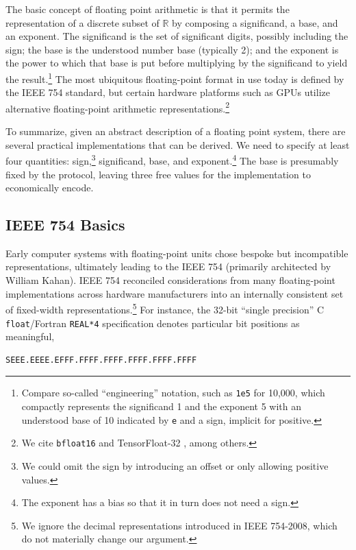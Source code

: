 \documentclass[twoside]{article}
\begin{document}
The basic concept of floating point arithmetic is that it permits the representation of a discrete subset of $\mathbb{R}$ by composing a significand, a base, and an exponent.  The significand is the set of significant digits, possibly including the sign; the base is the understood number base (typically 2); and the exponent is the power to which that base is put before multiplying by the significand to yield the result.\footnote{Compare so-called “engineering” notation, such as \texttt{1e5} for 10,000, which compactly represents the significand 1 and the exponent 5 with an understood base of 10 indicated by \texttt{e} and a sign, implicit for positive.}  The most ubiquitous floating-point format in use today is defined by the IEEE 754 standard, but certain hardware platforms such as GPUs utilize alternative floating-point arithmetic representations.\footnote{We cite \texttt{bfloat16} \citep{Wang2019} and TensorFloat-32 \citep{Kharva2020}, among others.}

To summarize, given an abstract description of a floating point system, there are several practical implementations that can be derived.  We need to specify at least four quantities:  sign,\footnote{We could omit the sign by introducing an offset or only allowing positive values.} significand, base, and exponent.\footnote{The exponent has a bias so that it in turn does not need a sign.}  The base is presumably fixed by the protocol, leaving three free values for the implementation to economically encode.


\subsection{IEEE 754 Basics}

Early computer systems with floating-point units chose bespoke but incompatible representations, ultimately leading to the IEEE 754 (primarily architected by William Kahan).  IEEE 754 reconciled considerations from many floating-point implementations across hardware manufacturers into an internally consistent set of fixed-width representations.\footnote{We ignore the decimal representations introduced in IEEE 754-2008, which do not materially change our argument.}  For instance, the 32-bit “single precision” C \texttt{float}/Fortran \texttt{REAL*4} specification denotes particular bit positions as meaningful,

\begin{lstlisting}[style=listingcode]
SEEE.EEEE.EFFF.FFFF.FFFF.FFFF.FFFF.FFFF
\end{lstlisting}
\end{document}
